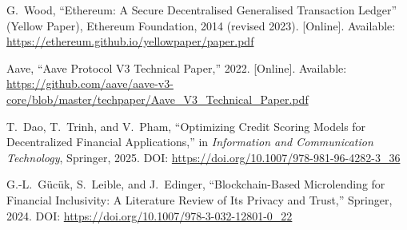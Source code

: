 \documentclass[12pt,a4paper]{report}
\begin{document}
{\begin{enumerate}[label={[\arabic*]}]
\item G.~Wood, ``Ethereum: A Secure Decentralised Generalised Transaction Ledger'' (Yellow Paper), Ethereum Foundation, 2014 (revised 2023). [Online]. Available: \url{https://ethereum.github.io/yellowpaper/paper.pdf}

\item Aave, ``Aave Protocol V3 Technical Paper,'' 2022. [Online]. Available: \url{https://github.com/aave/aave-v3-core/blob/master/techpaper/Aave_V3_Technical_Paper.pdf}

\item T.~Dao, T.~Trinh, and V.~Pham, ``Optimizing Credit Scoring Models for Decentralized Financial Applications,'' in \textit{Information and Communication Technology}, Springer, 2025. DOI: \url{https://doi.org/10.1007/978-981-96-4282-3_36}

\item G.-L.~G\"{u}c\"{u}k, S.~Leible, and J.~Edinger, ``Blockchain-Based Microlending for Financial Inclusivity: A Literature Review of Its Privacy and Trust,'' Springer, 2024. DOI: \url{https://doi.org/10.1007/978-3-032-12801-0_22}
\end{enumerate}
}
\end{document}
